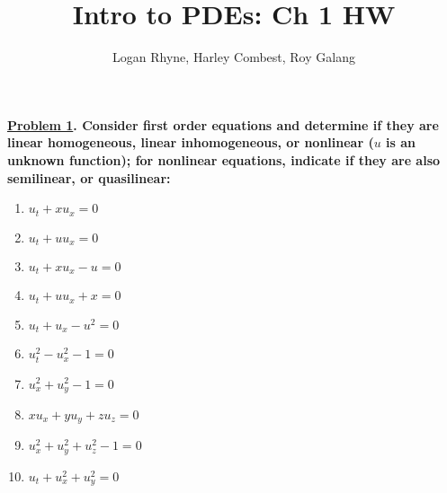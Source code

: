 \documentclass{article}
\title{Intro to PDEs: Ch 1 HW}
\author{Logan Rhyne, Harley Combest, Roy Galang}
\theoremstyle{definition}
\newenvironment{boldenv}{\bfseries\boldmath}{}
\begin{document}
	
	\maketitle
	
	\begin{boldenv}
		\underline{Problem 1}. Consider first order equations and determine if they are linear homogeneous, linear inhomogeneous, or nonlinear ($u$
		is an unknown function); for nonlinear equations, indicate if they are also semilinear, or quasilinear:
		\begin{enumerate}[(1), series=problems]
			\item $u_t + xu_x = 0$
			\item $u_t + uu_x = 0$
			\item $u_t + xu_x - u = 0$
			\item $u_t + uu_x + x = 0$
			\item $u_t + u_x - u^2 = 0$
			\item $u_t^2 - u_x^2 - 1 = 0$
			\item $u_x^2 + u_y^2 - 1 = 0$
			\item $xu_x + yu_y + zu_z = 0$
			\item $u_x^2 + u_y^2 + u_z^2 - 1 = 0$
			\item $u_t + u_x^2 + u_y^2 = 0$
		\end{enumerate}
	\end{boldenv}
	
\end{document}
